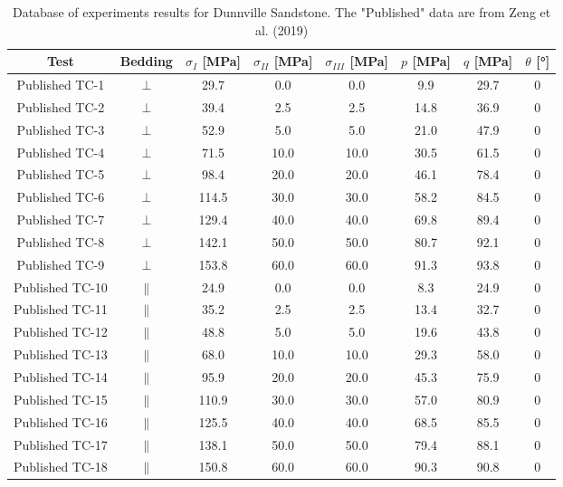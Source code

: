 \begin{table}
    \centering
    \captionsetup{justification=centering}
    \caption{Database of experiments results for Dunnville Sandstone. The "Published" data are from Zeng et al. (2019) \cite{Zeng2019}}
    \begin{tabular}{cccccccc}
        \hline 
        Test & Bedding & $\sigma_I$ [\si{MPa}] & $\sigma_{II}$ [\si{MPa}] &$\sigma_{III}$ [\si{MPa}] & $p$ [\si{MPa}] & $q$ [\si{MPa}] & $\theta$ [\si{\degree}] \\
        \hline
        \hline
        Published TC-1 & \(\perp\) & 29.7 & 0.0 & 0.0 & 9.9 & 29.7 & 0 \\
        Published TC-2 & \(\perp\) & 39.4 & 2.5 & 2.5 & 14.8 & 36.9 & 0 \\
        Published TC-3 & \(\perp\) & 52.9 & 5.0 & 5.0 & 21.0 & 47.9 & 0 \\
        Published TC-4 & \(\perp\) & 71.5 & 10.0 & 10.0 & 30.5 & 61.5 & 0 \\
        Published TC-5 & \(\perp\) & 98.4 & 20.0 & 20.0 & 46.1 & 78.4 & 0 \\
        Published TC-6 & \(\perp\) & 114.5 & 30.0 & 30.0 & 58.2 & 84.5 & 0 \\
        Published TC-7 & \(\perp\)& 129.4 & 40.0 & 40.0 & 69.8 & 89.4 & 0 \\
        Published TC-8 & \(\perp\) & 142.1 & 50.0 & 50.0 & 80.7 & 92.1 & 0 \\
        Published TC-9 & \(\perp\) & 153.8 & 60.0 & 60.0 & 91.3 & 93.8 & 0 \\
        Published TC-10 & \(\|\) & 24.9 & 0.0 & 0.0 & 8.3 & 24.9 & 0 \\
        Published TC-11 & \(\|\) & 35.2 & 2.5 & 2.5 & 13.4 & 32.7 & 0 \\
        Published TC-12 & \(\|\) & 48.8 & 5.0 & 5.0 & 19.6 & 43.8 & 0 \\
        Published TC-13 & \(\|\) & 68.0 & 10.0 & 10.0 & 29.3 & 58.0 & 0 \\
        Published TC-14 & \(\|\) & 95.9 & 20.0 & 20.0 & 45.3 & 75.9 & 0 \\
        Published TC-15 & \(\|\) & 110.9 & 30.0 & 30.0 & 57.0 & 80.9 & 0 \\
        Published TC-16 & \(\|\) & 125.5 & 40.0 & 40.0 & 68.5 & 85.5 & 0 \\
        Published TC-17 & \(\|\) & 138.1 & 50.0 & 50.0 & 79.4 & 88.1 & 0 \\
        Published TC-18 & \(\|\) & 150.8 & 60.0 & 60.0 & 90.3 & 90.8 & 0 \\

\end{tabular}
\end{table}
